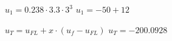 \( u_1 = 0.238 \cdot 3.3 \cdot 3^3 \)  
\( u_1 = -50 + 12 \)  

\( u_T = u_{FL} + x \cdot (u_f - u_{FL}) \)  
\( u_T = -200.0928 \)
